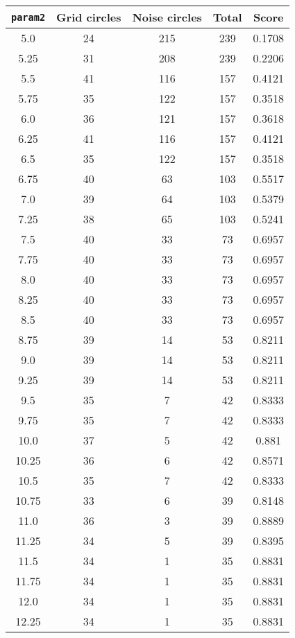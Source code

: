 \documentclass[letterpaper, 12pt]{article}
\begin{document}
\begin{longtable}{|c|c|c|c|c|}
\hline
\textbf{\texttt{param2}} & \textbf{Grid circles} & \textbf{Noise circles} & \textbf{Total} & \textbf{Score} \\
\hline
5.0 & 24 & 215 & 239 & 0.1708 \\
\hline
5.25 & 31 & 208 & 239 & 0.2206 \\
\hline
5.5 & 41 & 116 & 157 & 0.4121 \\
\hline
5.75 & 35 & 122 & 157 & 0.3518 \\
\hline
6.0 & 36 & 121 & 157 & 0.3618 \\
\hline
6.25 & 41 & 116 & 157 & 0.4121 \\
\hline
6.5 & 35 & 122 & 157 & 0.3518 \\
\hline
6.75 & 40 & 63 & 103 & 0.5517 \\
\hline
7.0 & 39 & 64 & 103 & 0.5379 \\
\hline
7.25 & 38 & 65 & 103 & 0.5241 \\
\hline
7.5 & 40 & 33 & 73 & 0.6957 \\
\hline
7.75 & 40 & 33 & 73 & 0.6957 \\
\hline
8.0 & 40 & 33 & 73 & 0.6957 \\
\hline
8.25 & 40 & 33 & 73 & 0.6957 \\
\hline
8.5 & 40 & 33 & 73 & 0.6957 \\
\hline
8.75 & 39 & 14 & 53 & 0.8211 \\
\hline
9.0 & 39 & 14 & 53 & 0.8211 \\
\hline
9.25 & 39 & 14 & 53 & 0.8211 \\
\hline
9.5 & 35 & 7 & 42 & 0.8333 \\
\hline
9.75 & 35 & 7 & 42 & 0.8333 \\
\hline
10.0 & 37 & 5 & 42 & 0.881 \\
\hline
10.25 & 36 & 6 & 42 & 0.8571 \\
\hline
10.5 & 35 & 7 & 42 & 0.8333 \\
\hline
10.75 & 33 & 6 & 39 & 0.8148 \\
\hline
11.0 & 36 & 3 & 39 & 0.8889 \\
\hline
11.25 & 34 & 5 & 39 & 0.8395 \\
\hline
11.5 & 34 & 1 & 35 & 0.8831 \\
\hline
11.75 & 34 & 1 & 35 & 0.8831 \\
\hline
12.0 & 34 & 1 & 35 & 0.8831 \\
\hline
12.25 & 34 & 1 & 35 & 0.8831 \\
\hline

\end{longtable}
\end{document}
